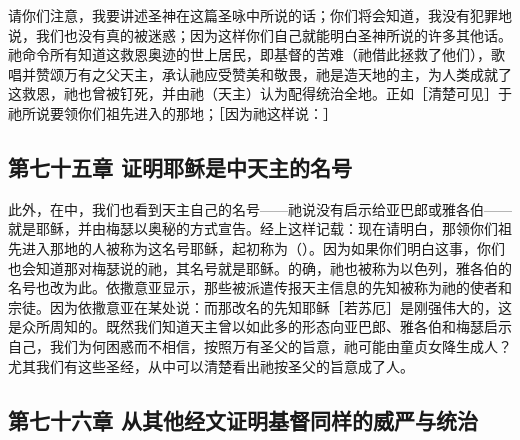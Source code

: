 请你们注意，我要讲述圣神在这篇圣咏中所说的话；你们将会知道，我没有犯罪地说，我们也没有真的被迷惑；因为这样你们自己就能明白圣神所说的许多其他话。\newline{}祂命令所有知道这救恩奥迹的世上居民，即基督的苦难（祂借此拯救了他们），歌唱并赞颂万有之父天主，承认祂应受赞美和敬畏，祂是造天地的主，为人类成就了这救恩，祂也曾被钉死，并由祂（天主）认为配得统治全地。正如［清楚可见］于祂所说要领你们祖先进入的那地；［因为祂这样说：］\par


\subsection{第七十五章 证明耶稣是中天主的名号}

此外，在中，我们也看到天主自己的名号——祂说没有启示给亚巴郎或雅各伯——就是耶稣，并由梅瑟以奥秘的方式宣告。经上这样记载：现在请明白，那领你们祖先进入那地的人被称为这名号耶稣，起初称为（）。因为如果你们明白这事，你们也会知道那对梅瑟说的祂，其名号就是耶稣。的确，祂也被称为以色列，雅各伯的名号也改为此。依撒意亚显示，那些被派遣传报天主信息的先知被称为祂的使者和宗徒。因为依撒意亚在某处说：而那改名的先知耶稣［若苏厄］是刚强伟大的，这是众所周知的。既然我们知道天主曾以如此多的形态向亚巴郎、雅各伯和梅瑟启示自己，我们为何困惑而不相信，按照万有圣父的旨意，祂可能由童贞女降生成人？尤其我们有这些圣经，从中可以清楚看出祂按圣父的旨意成了人。\par


\subsection{第七十六章 从其他经文证明基督同样的威严与统治}

